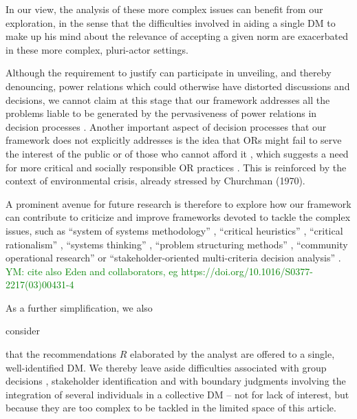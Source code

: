 \documentclass[preprint, french, english, 11pt, authoryear]{elsarticle}%
\newcommand{\commentYM}[1]{\textcolor{green}{YM: #1}}
\begin{document}
In our view, the analysis of these more complex issues can benefit from our exploration, in the sense that the difficulties involved in aiding a single \ac{DM} to make up his mind about the relevance of accepting a given norm are exacerbated in these more complex, pluri-actor settings.

\begin{changebar}Although the requirement to justify can participate in unveiling, and thereby denouncing, power relations which could otherwise have distorted discussions and decisions, we cannot claim at this stage that our framework addresses all the problems liable to be generated by the pervasiveness of power relations in decision processes \citep{cronin_issues_2014}.
Another important aspect of decision processes that our framework does not explicitly addresses is the idea that \acp{OR} might fail to serve the interest of the public or of those who cannot afford it \citep{rosenhead_report_1986}, which suggests a need for more critical and socially responsible OR practices \citep{jackson_systems_2000,ulrich_beyond_2003}. This is reinforced by the context of environmental crisis, already stressed by Churchman (1970).\end{changebar}
A prominent avenue for future research is therefore to explore how our framework can contribute to criticize and improve frameworks devoted to tackle the complex issues, such as ``system of systems methodology'' \citep{jackson_towards_1984}, ``critical heuristics'' \citep{ulrich_critical_1987}, ``critical rationalism'' \citep{ormerod_critical_2014}, ``systems thinking'' \citep{mingers_review_2010}, ``problem structuring methods'' \citep{hector_problem-structuring_2009}, ``community operational research'' \citep{johnson_emerging_2018} or ``stakeholder-oriented multi-criteria decision analysis'' \citep{de_brucker_multi-criteria_2013}.
\commentYM{cite also Eden and collaborators, eg https://doi.org/10.1016/S0377-2217(03)00431-4}

As a further simplification, we also \begin{changebar}consider\end{changebar} that the recommendations $R$ elaborated by the analyst are offered to a single, well-identified \ac{DM}.
We thereby leave aside difficulties associated with group decisions \citep{jackson_towards_1984}, stakeholder identification \citep{wang_systemic_2015} and with boundary judgments involving the integration of several individuals in a collective \ac{DM} \citep{midgley_systemic_2000}
-- not for lack of interest, but because they are too complex to be tackled in the limited space of this article.
\end{document}

